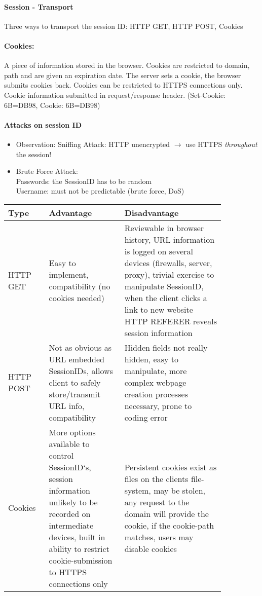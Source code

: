 \paragraph{Session - Transport} 
Three ways to transport the session ID: HTTP GET, HTTP POST, Cookies

\paragraph{Cookies:} A piece of information stored in the browser. Cookies are restricted to domain, path and are given an expiration date. The server sets a cookie, the browser submits cookies back. Cookies can be restricted to HTTPS connections only. Cookie information submitted in request/response header. (Set-Cookie: 6B=DB98, Cookie: 6B=DB98)

\paragraph{Attacks on session ID}
\begin{itemize}
\item Observation: Sniffing Attack: HTTP unencrypted $\to$ use HTTPS \emph{throughout} the session!
\item Brute Force Attack:\\ \quad Passwords: the SessionID has to be random \\ \quad Username: must not be predictable (brute force, DoS)
\end{itemize}

\begin{tabular}{p{0.15\linewidth}p{0.3\linewidth}p{0.4\linewidth}}
Type & Advantage & Disadvantage \\
\hline
\hline
HTTP GET & Easy to implement, compatibility (no cookies needed)  &  Reviewable in browser history, URL information is logged on several devices (firewalls, server, proxy), trivial exercise to manipulate SessionID, when the client clicks a link to new website HTTP REFERER reveals session information \\
\hline
HTTP POST & Not as obvious as URL embedded SessionIDs, allows client to safely store/transmit URL info, compatibility & Hidden fields not really hidden, easy to manipulate, more complex webpage creation processes necessary, prone to coding error \\
\hline
Cookies & More options available to control SessionID‘s, session information unlikely to be recorded on intermediate devices, built in ability to restrict cookie-submission to HTTPS connections only & Persistent cookies exist as files on the clients file-system, may be stolen, any request to the domain will provide the cookie, if the cookie-path matches, users may disable cookies \\
\end{tabular}

